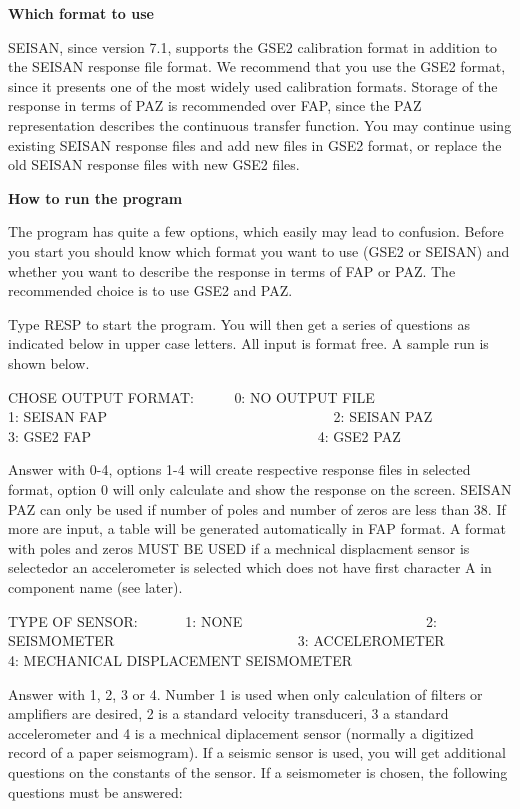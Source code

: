 \textbf{Which format to use}

SEISAN, since version 7.1, supports the GSE2 calibration format in addition to the SEISAN response file format. We recommend that you use the GSE2 format, since it presents one of the most widely used calibration formats. Storage of the response in terms of PAZ is recommended over FAP, since the PAZ representation describes the continuous transfer function. You may continue using existing SEISAN response files and add new files in GSE2 format, or replace the old SEISAN response files with new GSE2 files. 

\textbf{How to run the program}

The program has quite a few options, which easily may lead to confusion. Before you start you should know which format you want to use (GSE2 or SEISAN) and whether you want to describe the response in terms of FAP or PAZ. The recommended choice is to use GSE2 and PAZ. 

Type RESP to start the program. You will then get a series of questions as indicated below in upper case letters. All input is format free. A sample run is shown below. 

CHOSE OUTPUT FORMAT: \verb|     |0: NO OUTPUT FILE \newline
\verb|                               |1: SEISAN FAP \newline
\verb|                               |2: SEISAN PAZ \newline
\verb|                               |3: GSE2 FAP \newline
\verb|                               |4: GSE2 PAZ 

Answer with 0-4, options 1-4 will create respective response files in selected format, option 0 will only calculate and show the response on the screen. SEISAN PAZ can only be used if number of poles and number of zeros are less than 38. If more are input, a table will be generated automatically in FAP format. A format with poles and zeros MUST BE USED if a mechnical displacment sensor is selectedor an accelerometer is selected which does not have first character A in component name (see later). 

TYPE OF SENSOR: \verb|      |1: NONE \newline
\verb|                         |2: SEISMOMETER \newline
\verb|                         |3: ACCELEROMETER 
\verb|                         |4: MECHANICAL DISPLACEMENT SEISMOMETER 

Answer with 1, 2, 3 or 4. Number 1 is used when only calculation of filters or amplifiers are desired, 2 is a standard velocity transduceri,  3 a standard accelerometer and 4 is a mechnical diplacement sensor (normally a digitized record of a paper seismogram). If a seismic sensor is used, you will get additional questions on the constants of the sensor. If a seismometer is chosen, the following questions must be answered: 

